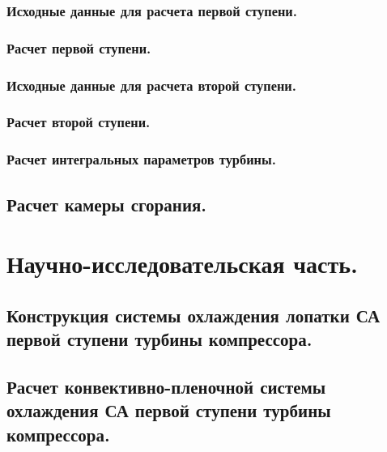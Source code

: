 \documentclass[a4paper,12pt]{article}
\begin{document}
    \subsubsection{Исходные данные для расчета первой ступени.}
    \subsubsection{Расчет первой ступени.}
    \subsubsection{Исходные данные для расчета второй ступени.}
    \subsubsection{Расчет второй ступени.}
    \subsubsection{Расчет интегральных параметров турбины.}

    \subsection{Расчет камеры сгорания.}

    \section{Научно-исследовательская часть.}
    \subsection{Конструкция системы охлаждения лопатки СА первой ступени турбины компрессора.}
    \subsection{Расчет конвективно-пленочной системы охлаждения СА первой ступени турбины компрессора.}
\end{document}
